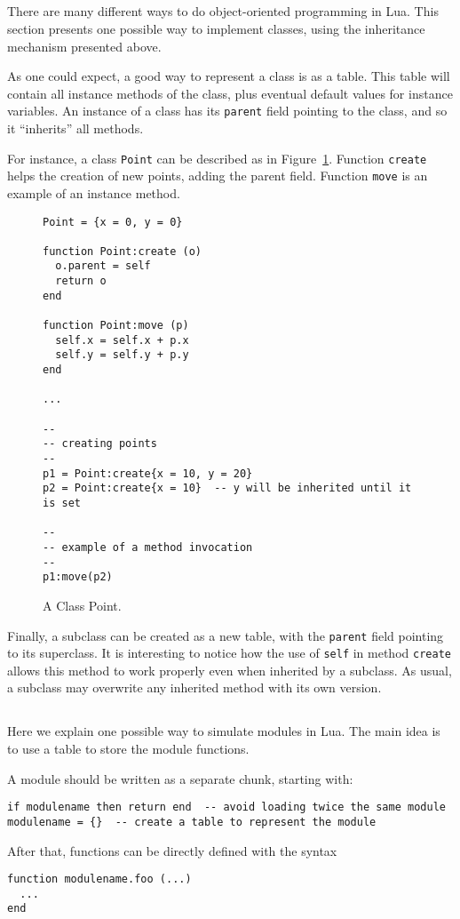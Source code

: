 \subsection{}
There are many different ways to do object-oriented programming in Lua.
This section presents one possible way to
implement classes,
using the inheritance mechanism presented above.

As one could expect, a good way to represent a class is
as a table.
This table will contain all instance methods of the class,
plus eventual default values for instance variables.
An instance of a class has its \verb'parent' field pointing to
the class,
and so it ``inherits'' all methods.

For instance, a class \verb'Point' can be described as in
Figure~\ref{Point}.
Function \verb'create' helps the creation of new points,
adding the parent field.
Function \verb'move' is an example of an instance method.
\begin{figure}
\Line
\begin{verbatim}
Point = {x = 0, y = 0}

function Point:create (o)
  o.parent = self
  return o
end

function Point:move (p)
  self.x = self.x + p.x
  self.y = self.y + p.y
end

...

--
-- creating points
--
p1 = Point:create{x = 10, y = 20}
p2 = Point:create{x = 10}  -- y will be inherited until it is set

--
-- example of a method invocation
--
p1:move(p2)
\end{verbatim}
\caption{A Class Point.\label{Point}}
\Line
\end{figure}
Finally, a subclass can be created as a new table,
with the \verb'parent' field pointing to its superclass.
It is interesting to notice how the use of \verb'self' in
method \verb'create' allows this method to work properly even
when inherited by a subclass.
As usual, a subclass may overwrite any inherited method with
its own version.

\subsection{}
Here we explain one possible way to simulate modules in Lua.
The main idea is to use a table to store the module functions.

A module should be written as a separate chunk, starting with:
\begin{verbatim}
if modulename then return end  -- avoid loading twice the same module
modulename = {}  -- create a table to represent the module
\end{verbatim}
After that, functions can be directly defined with the syntax
\begin{verbatim}
function modulename.foo (...)
  ...
end
\end{verbatim}

